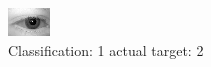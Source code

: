 \begin{figure}[h!]
\begin{center}
\includegraphics[width=0.60\columnwidth]{figures/ID449_class_1_target_2.png}
\end{center}
\caption{ Classification: 1 actual target: 2}
\label{fig:ID449_class_1_target_2}
\end{figure}
